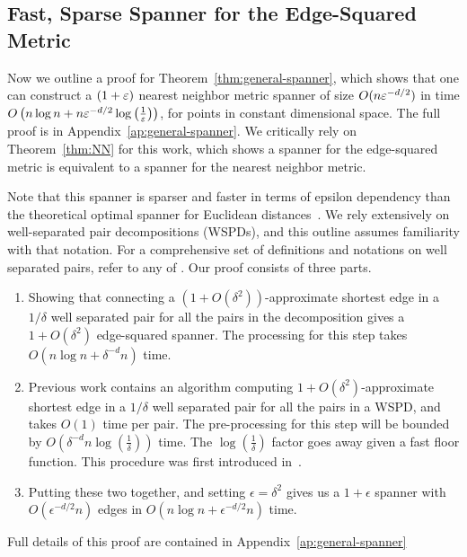 \subsection{Fast, Sparse Spanner for the Edge-Squared
Metric}
\label{sec:general-spanner}

Now we outline a proof for Theorem~\ref{thm:general-spanner}, which shows
that one can construct a $(1+\varepsilon)$ nearest neighbor metric spanner of size
$O(n \varepsilon^{-d/2})$ in
time $O\left(n \log n + n \varepsilon^{-d/2} \log \left(\frac{1}{\varepsilon}\right)\right)$, 
for points in constant dimensional space. The full proof is in
Appendix~\ref{ap:general-spanner}. We critically rely on
Theorem~\ref{thm:NN} for this work, which shows
a spanner for the edge-squared metric is equivalent to a spanner for the
nearest neighbor metric.

Note that this spanner is sparser and faster in terms of epsilon dependency
than the theoretical optimal spanner for Euclidean distances~\cite{Le19}.
We rely extensively on well-separated pair decompositions
(WSPDs),
and this outline assumes familiarity with that notation.
For a comprehensive set of definitions and notations on well separated
pairs, refer to any of \cite{Callahan1995, Arya2016, Callahan1993,
arya95euclid}.  
Our proof consists of three parts.
\begin{enumerate}
\item Showing that connecting a $(1+O(\delta^2))$-approximate shortest edge
in a $1/\delta$ well separated pair for all the pairs in the decomposition
gives a $1+O(\delta^2)$ edge-squared spanner.
The processing for this step takes $O(n \log n + \delta^{-d}n)$ time.
\item Previous work contains an algorithm computing
  $1+O(\delta^2)$-approximate shortest edge in a $1/\delta$ well
    separated pair for all the pairs in a WSPD, and takes
    $O(1)$ time per pair. The pre-processing for this step will be
    bounded by $O(\delta^{-d}n\log\left(\frac{1}{\delta}\right))$ time. The $\log\left(\frac{1}{\delta}\right)$ factor goes away given a fast floor function. 
    This procedure was first introduced in~\cite{Callahan1995}.

\item Putting these two together, and setting $\epsilon = \delta^2$
gives us a $1+\epsilon$ spanner with
$O(\epsilon^{-d/2}n)$ edges in
    $O(n \log n + \epsilon^{-d/2}n)$ time.
\end{enumerate}
Full details of this proof are contained in Appendix~\ref{ap:general-spanner}
